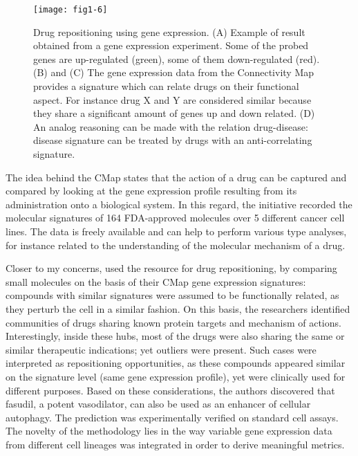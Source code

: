 \begin{figure}[ht]
    \centering
    \texttt{[image: fig1-6]}
    \caption{Drug repositioning using gene expression. (A) Example of result obtained from a gene expression experiment. Some of the probed genes are up-regulated (green), some of them down-regulated (red). (B) and (C) The gene expression data from the Connectivity Map provides a signature which can relate drugs on their functional aspect. For instance drug X and Y are considered similar because they share a significant amount of genes up and down related. (D) An analog reasoning can be made with the relation drug-disease: disease signature can be treated by drugs with an anti-correlating signature.}
    \label{fig1-6}
\end{figure}

The idea behind the CMap states that the action of a drug can be captured and compared by looking at the gene expression profile resulting from its administration onto a biological system. In this regard, the initiative recorded the molecular signatures of 164 FDA-approved molecules over 5 different cancer cell lines. The data is freely available and can help to perform various type analyses, for instance related to the understanding of the molecular mechanism of a drug.

Closer to my concerns, \citep{iorio2010discovery} used the resource for drug repositioning, by comparing small molecules on the basis of their CMap gene expression signatures: compounds with similar signatures were assumed to be functionally related, as they perturb the cell in a similar fashion. On this basis, the researchers identified communities of drugs sharing known protein targets and mechanism of actions. Interestingly, inside these hubs, most of the drugs were also sharing the same or similar therapeutic indications; yet outliers were present. Such cases were interpreted as repositioning opportunities, as these compounds appeared similar on the signature level (same gene expression profile), yet were clinically used for different purposes. Based on these considerations, the authors discovered that fasudil, a potent vasodilator, can also be used as an enhancer of cellular autophagy. The prediction was experimentally verified on standard cell assays. The novelty of the methodology lies in the way variable gene expression data from different cell lineages was integrated in order to derive meaningful metrics.


